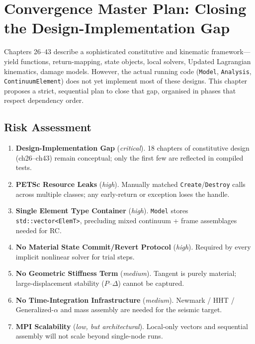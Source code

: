 
\chapter{Convergence Master Plan: Closing the Design-Implementation Gap}
\label{ch:convergence-master-plan}

Chapters 26--43 describe a sophisticated constitutive and kinematic
framework---yield functions, return-mapping, state objects, local solvers,
Updated Lagrangian kinematics, damage models.  However, the actual running
code (\texttt{Model}, \texttt{Analysis}, \texttt{ContinuumElement}) does not
yet implement most of these designs.  This chapter proposes a strict,
sequential plan to close that gap, organised in phases that respect
dependency order.

\section{Risk Assessment}
\label{sec:master-plan-risk}

\begin{enumerate}
  \item \textbf{Design-Implementation Gap} (\emph{critical}).
        18 chapters of constitutive design (ch26--ch43) remain conceptual;
        only the first few are reflected in compiled tests.
  \item \textbf{PETSc Resource Leaks} (\emph{high}).
        Manually matched \texttt{Create}/\texttt{Destroy} calls across
        multiple classes; any early-return or exception loses the handle.
  \item \textbf{Single Element Type Container} (\emph{high}).
        \texttt{Model} stores \texttt{std::vector<ElemT>}, precluding
        mixed continuum + frame assemblages needed for RC.
  \item \textbf{No Material State Commit/Revert Protocol} (\emph{high}).
        Required by every implicit nonlinear solver for trial steps.
  \item \textbf{No Geometric Stiffness Term} (\emph{medium}).
        Tangent is purely material; large-displacement stability
        ($P$--$\Delta$) cannot be captured.
  \item \textbf{No Time-Integration Infrastructure} (\emph{medium}).
        Newmark / HHT / Generalized-$\alpha$ and mass assembly are
        needed for the seismic target.
  \item \textbf{MPI Scalability} (\emph{low, but architectural}).
        Local-only vectors and sequential assembly will not scale
        beyond single-node runs.
\end{enumerate}


